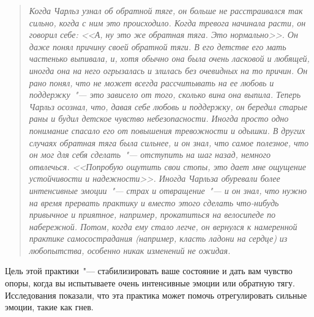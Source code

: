 \begin{quotation}
	\textit{Когда Чарльз узнал об обратной тяге, он больше не расстраивался так сильно, когда с ним это происходило. Когда тревога начинала расти, он говорил себе: <<А, ну это же обратная тяга. Это нормально>>. Он даже понял причину своей обратной тяги. В его детстве его мать частенько выпивала, и, хотя обычно она была очень ласковой и любящей, иногда она на него огрызалась и злилась без очевидных на то причин. Он рано понял, что не может всегда рассчитывать на ее любовь и поддержку~"--- это зависело от того, сколько вина она выпила. Теперь Чарльз осознал, что, давая себе любовь и поддержку, он бередил старые раны и будил детское чувство небезопасности. Иногда просто одно понимание спасало его от повышения тревожности и одышки. В других случаях обратная тяга была сильнее, и он знал, что самое полезное, что он мог для себя сделать~"--- отступить на шаг назад, немного отвлечься. <<Попробую ощутить свои стопы, это дает мне ощущение устойчивости и надежности>>. Иногда Чарльза обуревали более интенсивные эмоции~"--- страх и отвращение~"--- и он знал, что нужно на время прервать практику и вместо этого сделать что-нибудь привычное и приятное, например, прокатиться на велосипеде по набережной. Потом, когда ему стало легче, он вернулся к намеренной практике самосострадания (например, класть ладони на сердце) из любопытства, особенно никак изменений не ожидая.}
\end{quotation}

\newpage
{}\label{IP:Feeling_the_Soles_of_Your_Feet}
Цель этой практики~"--- стабилизировать ваше состояние и дать вам чувство опоры, когда вы испытываете очень интенсивные эмоции или обратную тягу. Исследования показали, что эта практика может помочь отрегулировать сильные эмоции, такие как гнев.

